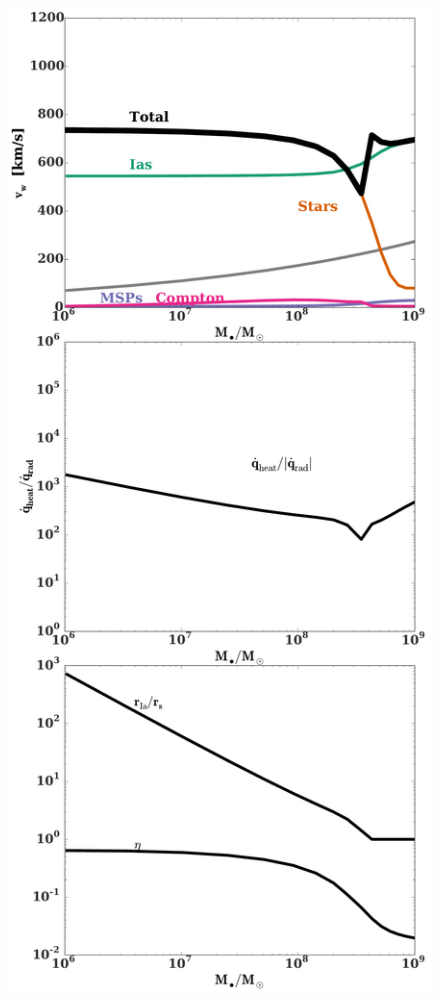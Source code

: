 \documentclass[usenatbib,fleqn]{mn2e}
\begin{document}
\begin{figure}
\includegraphics[width=\columnwidth]{vwSources.pdf}

\end{figure}
\end{document}
